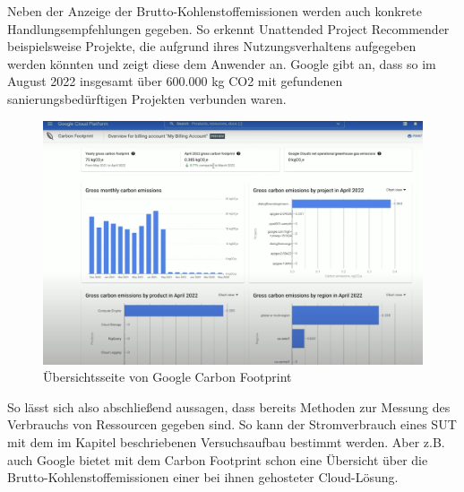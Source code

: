 \documentclass[utf8,biblatex]{lni}
\begin{document}
\newline
Neben der Anzeige der Brutto-Kohlenstoffemissionen werden auch konkrete Handlungsempfehlungen gegeben. So erkennt Unattended Project Recommender beispielsweise Projekte, die aufgrund ihres Nutzungsverhaltens aufgegeben werden könnten und zeigt diese dem Anwender an. Google gibt an, dass so im August 2022 insgesamt über 600.000 kg CO2 mit gefundenen sanierungsbedürftigen Projekten verbunden waren. \cite{Talbott21}
\begin{figure}[ht]
\centering
\includegraphics[width=.7\linewidth]{Google-Carbon-Footprint.png}
\caption{{\centering 
Übersichtsseite von Google Carbon Footprint \cite{GoogleCloud.1182022}
}}
\label{carbonfootprint}
\end{figure}

So lässt sich also abschließend aussagen, dass bereits Methoden zur Messung des Verbrauchs von Ressourcen gegeben sind. So kann der Stromverbrauch eines SUT mit dem im Kapitel beschriebenen Versuchsaufbau bestimmt werden. Aber z.B. auch Google bietet mit dem Carbon Footprint schon eine Übersicht über die Brutto-Kohlenstoffemissionen einer bei ihnen gehosteter Cloud-Lösung.
\end{document}
